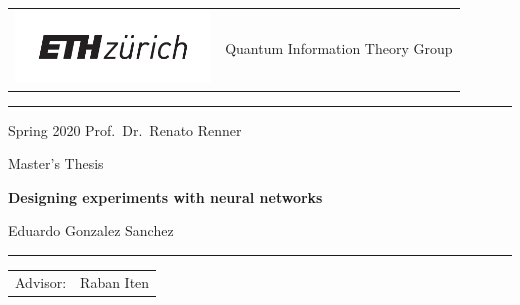 \documentclass[11pt,a4paper,twoside]{report}
\newcommand{\+}{\textnormal{+} }
\theoremstyle{definition}
\numberwithin{equation}{chapter}
\begin{document}
\begin{titlepage}
  \mbox{}

  \vspace{-1.5cm}
  \noindent
  \begin{tabular}{@{} l @{} l @{}}
    \begin{minipage}[c]{0.5\textwidth}
      \hspace{-4mm}
      \includegraphics[height=19mm]{figures/eth_logo.pdf}
    \end{minipage} &
    \begin{minipage}[c]{0.5\textwidth}
       \hfill \large Quantum Information Theory Group
    \end{minipage} \\
  \end{tabular}
  \rule{\textwidth}{0.5pt}
  \begin{center}
    {\Large 
      Spring 2020 \hfill Prof.~Dr.~Renato Renner
    }
    
    \LARGE
    Master's Thesis
 
    \Huge\textbf{
    Designing experiments with neural networks
          }
    
    \LARGE{
      Eduardo Gonzalez Sanchez
    }
    
    \rule{\textwidth}{0.5pt}
   
    \vspace{0.0cm}
    \begin{flushleft}
      \begin{tabular}{ll}
        \Large Advisor: & \Large 
        Raban Iten
      \end{tabular}
    \end{flushleft}
  \end{center}
\end{titlepage}
%

\thispagestyle{plain}
\cleardoublepage
\end{document}
